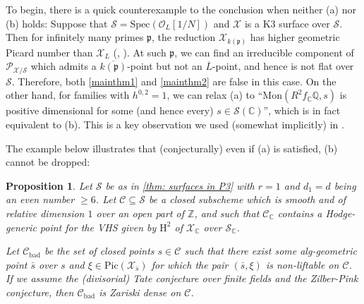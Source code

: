 \documentclass[letter, 11pt]{article}
\theoremstyle{plain}
\newtheorem{proposition}[subsubsection]{Proposition}
\theoremstyle{definition}
\newcommand{\IC}{\mathbb{C}}
\newcommand{\IP}{\mathbb{P}}
\newcommand{\IQ}{\mathbb{Q}}
\newcommand{\IZ}{\mathbb{Z}}
\newcommand{\sC}{\mathcal{C}}
\newcommand{\Spec}{\mathrm{Spec}}
\newcommand{\<}{\langle}
\renewcommand{\>}{\rangle}
\newcommand{\fp}{\mathfrak{p}}
\newcommand{\sX}{\mathcal{X}}
\newcommand{\sS}{\mathcal{S}}
\newcommand{\sO}{\mathcal{O}}
\newcommand{\shPic}{\mathscr{P}}
\newcommand{\Pic}{\mathrm{Pic}}
\renewcommand{\H}{\mathrm{H}}
\begin{document}
To begin, there is a quick counterexample to the conclusion when neither (a) nor (b) holds: Suppose that $\sS = \Spec(\sO_L[1/N])$ and $\sX$ is a K3 surface over $\sS$. Then for infinitely many primes $\fp$, the reduction $\sX_{k(\fp)}$ has higher geometric Picard number than $\sX_L$ (\cite[Thm~1.1]{SSTT}, \cite[Thm~1.1]{Tayou}). At such $\fp$, we can find an irreducible component of $\shPic_{\sX/\sS}$ which admits a $\overline{k(\fp)}$-point but not an $\overline{L}$-point, and hence is not flat over $\sS$. Therefore, both \ref{mainthm1} and \ref{mainthm2} are false in this case. On the other hand, for families with $h^{0, 2} = 1$, we can relax (a) to ``$\mathrm{Mon}(R^2f_{\IC} \IQ, s)$ is positive dimensional for some (and hence every) $s \in \sS(\IC)$'', which is in fact equivalent to (b). This is a key observation we used (somewhat implicitly) in \cite{HYZ}.

The example below illustrates that (conjecturally) even if (a) is satisfied, (b) cannot be dropped: 

\begin{proposition}
Let $\sS$ be as in \ref{thm: surfaces in P3} with $r = 1$ and $d_1 = d$ being an even number $\ge 6$. Let $\sC \subseteq \sS$ be a closed subscheme which is smooth and of relative dimension $1$ over an open part of $\IZ$, and such that $\sC_{\IC}$ contains a Hodge-generic point for the VHS given by $\H^2$ of $\sX_\IC$ over $\sS_\IC$. 

Let $\sC_{\mathrm{bad}}$ be the set of closed points $s \in \sC$ such that there exist some alg-geometric point $\bar{s}$ over $s$ and $\xi \in \Pic(\sX_{\bar{s}})$ for which the pair $(\bar{s}, \xi)$ is non-liftable on $\sC$. If we assume the (divisorial) Tate conjecture over finite fields and the Zilber-Pink conjecture, then $\sC_{\mathrm{bad}}$ is Zariski dense on $\sC$. 
\end{proposition}
\end{document}
